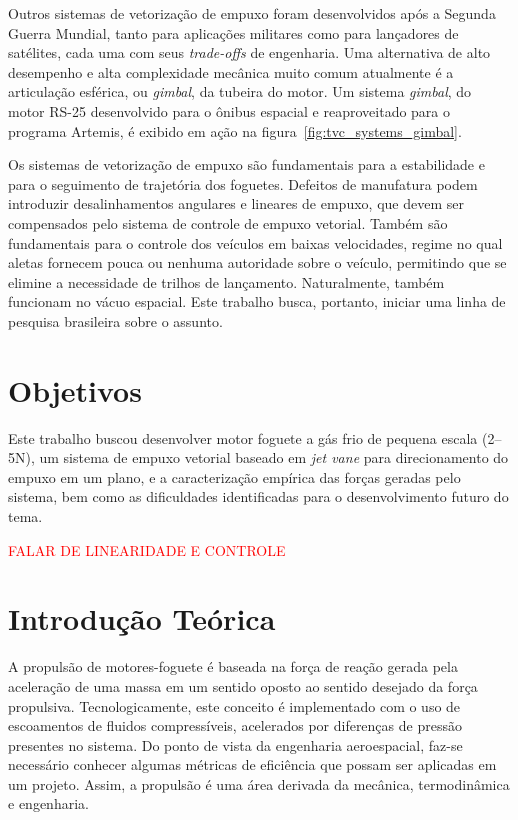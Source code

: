 Outros sistemas de vetorização de empuxo foram desenvolvidos após a Segunda Guerra Mundial, tanto para aplicações militares como para lançadores de satélites, cada uma com seus \textit{trade-offs} de engenharia. Uma alternativa de alto desempenho e alta complexidade mecânica muito comum atualmente é a articulação esférica, ou \textit{gimbal}, da tubeira do motor. Um sistema \textit{gimbal}, do motor RS-25 desenvolvido para o ônibus espacial e reaproveitado para o programa Artemis, é exibido em ação na figura~\ref{fig:tvc_systems_gimbal}.

Os sistemas de vetorização de empuxo são fundamentais para a estabilidade e para o seguimento de trajetória dos foguetes. Defeitos de manufatura podem introduzir desalinhamentos angulares e lineares de empuxo, que devem ser compensados pelo sistema de controle de empuxo vetorial. Também são fundamentais para o controle dos veículos em baixas velocidades, regime no qual aletas fornecem pouca ou nenhuma autoridade sobre o veículo, permitindo que se elimine a necessidade de trilhos de lançamento. Naturalmente, também funcionam no vácuo espacial. Este trabalho busca, portanto, iniciar uma linha de pesquisa brasileira sobre o assunto.

\section{Objetivos}

Este trabalho buscou desenvolver motor foguete a gás frio de pequena escala (2--5N), um sistema de empuxo vetorial baseado em \textit{jet vane} para direcionamento do empuxo em um plano, e a caracterização empírica das forças geradas pelo sistema, bem como as dificuldades identificadas para o desenvolvimento futuro do tema.

\textcolor{red}{FALAR DE LINEARIDADE E CONTROLE}

\section{Introdução Teórica}\label{sec:intro}
A propulsão de motores-foguete é baseada na força de reação gerada pela aceleração de uma massa em um sentido oposto ao sentido desejado da força propulsiva. Tecnologicamente, este conceito é implementado com o uso de escoamentos de fluidos compressíveis, acelerados por diferenças de pressão presentes no sistema. Do ponto de vista da engenharia aeroespacial, faz-se necessário conhecer algumas métricas de eficiência que possam ser aplicadas em um projeto. Assim, a propulsão é uma área derivada da mecânica, termodinâmica e engenharia.

